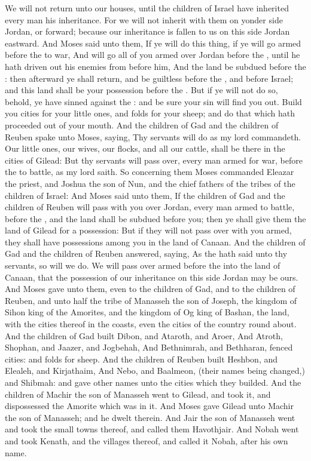 \begin{biblechapter}
\verse We will not return unto our houses, until the children of Israel have inherited every man his inheritance.
\verse For we will not inherit with them on yonder side Jordan, or forward; because our inheritance is fallen to us on this side Jordan eastward.
\verse And Moses said unto them, If ye will do this thing, if ye will go armed before the \LORD to war,
\verse And will go all of you armed over Jordan before the \LORD, until he hath driven out his enemies from before him,
\verse And the land be subdued before the \LORD: then afterward ye shall return, and be guiltless before the \LORD, and before Israel; and this land shall be your possession before the \LORD.
\verse But if ye will not do so, behold, ye have sinned against the \LORD: and be sure your sin will find you out.
\verse Build you cities for your little ones, and folds for your sheep; and do that which hath proceeded out of your mouth.
\verse And the children of Gad and the children of Reuben spake unto Moses, saying, Thy servants will do as my lord commandeth.
\verse Our little ones, our wives, our flocks, and all our cattle, shall be there in the cities of Gilead:
\verse But thy servants will pass over, every man armed for war, before the \LORD to battle, as my lord saith.
\verse So concerning them Moses commanded Eleazar the priest, and Joshua the son of Nun, and the chief fathers of the tribes of the children of Israel:
\verse And Moses said unto them, If the children of Gad and the children of Reuben will pass with you over Jordan, every man armed to battle, before the \LORD, and the land shall be subdued before you; then ye shall give them the land of Gilead for a possession:
\verse But if they will not pass over with you armed, they shall have possessions among you in the land of Canaan.
\verse And the children of Gad and the children of Reuben answered, saying, As the \LORD hath said unto thy servants, so will we do.
\verse We will pass over armed before the \LORD into the land of Canaan, that the possession of our inheritance on this side Jordan may be ours.
\verse And Moses gave unto them, even to the children of Gad, and to the children of Reuben, and unto half the tribe of Manasseh the son of Joseph, the kingdom of Sihon king of the Amorites, and the kingdom of Og king of Bashan, the land, with the cities thereof in the coasts, even the cities of the country round about.
\verse And the children of Gad built Dibon, and Ataroth, and Aroer,
\verse And Atroth, Shophan, and Jaazer, and Jogbehah,
\verse And Bethnimrah, and Bethharan, fenced cities: and folds for sheep.
\verse And the children of Reuben built Heshbon, and Elealeh, and Kirjathaim,
\verse And Nebo, and Baalmeon, (their names being changed,) and Shibmah: and gave other names unto the cities which they builded.
\verse And the children of Machir the son of Manasseh went to Gilead, and took it, and dispossessed the Amorite which was in it.
\verse And Moses gave Gilead unto Machir the son of Manasseh; and he dwelt therein.
\verse And Jair the son of Manasseh went and took the small towns thereof, and called them Havothjair.
\verse And Nobah went and took Kenath, and the villages thereof, and called it Nobah, after his own name.
\end{biblechapter}

